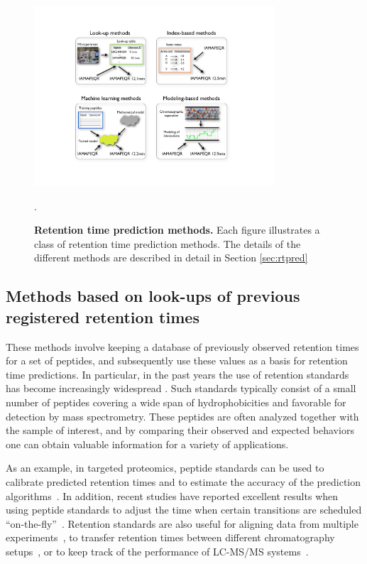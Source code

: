 \documentclass[a4paper]{article}
\begin{document}
\begin{figure}[!h]
\centering \includegraphics[clip=true,
  width=0.8\textwidth]{img/methods.pdf}
\caption{\label{fig:methods} {\bf Retention time prediction methods.}
  Each figure illustrates a class of retention time prediction
  methods. The details of the different methods are described in
  detail in Section \ref{sec:rtpred}}.
\vspace{-7pt}
\end{figure}

\subsection{Methods based on look-ups of previous registered retention times}

These methods involve keeping a database of previously observed
retention times for a set of peptides, and subsequently use these
values as a basis for retention time predictions. In particular, in
the past years the use of retention standards has become increasingly
widespread \cite{olegstd, irt}. Such standards typically consist of a
small number of peptides covering a wide span of hydrophobicities and
favorable for detection by mass spectrometry. These peptides are often
analyzed together with the sample of interest, and by comparing their
observed and expected behaviors one can obtain valuable information
for a variety of applications.

\vspace{0.15cm}

As an example, in targeted proteomics, peptide standards can be used to
 calibrate predicted retention times and to estimate the accuracy of
 the prediction algorithms~\cite{Kiyonami01022011}. In addition,
 recent studies have reported excellent results when using peptide
 standards to adjust the time when certain transitions are scheduled
 ``on-the-fly''~\cite{seb, irt}. Retention standards are also useful
 for aligning data from multiple experiments~\cite{petritis2003}, to
 transfer retention times between different chromatography
 setups~\cite{seb}, or to keep track of the performance of LC-MS/MS
 systems~\cite{qcal}.
\end{document}
